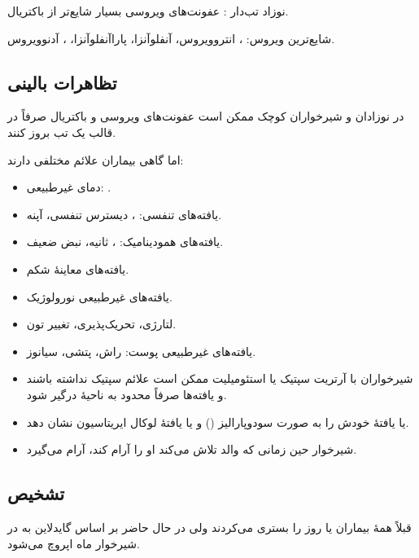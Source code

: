 \documentclass[12pt,a4paper]{article}
\begin{document}
نوزاد تب‌دار : عفونت‌های ویروسی بسیار شایع‌تر از باکتریال.

شایع‌ترین ویروس: ، انتروویروس، آنفلوآنزا، پاراآنفلوآنزا، ، آدنوویروس.

\subsection*{تظاهرات بالینی}
در نوزادان و شیرخواران کوچک ممکن است عفونت‌های ویروسی و باکتریال صرفاً در قالب یک تب بروز کنند.

اما گاهی بیماران علائم مختلفی دارند:
\begin{itemize}
\item دمای غیرطبیعی: .
\item یافته‌های تنفسی: ، دیسترس تنفسی، آپنه.
\item یافته‌های همودینامیک: ،  ثانیه، نبض ضعیف.
\item یافته‌های معاینهٔ شکم.
\item یافته‌های غیرطبیعی نورولوژیک.
\item لتارژی، تحریک‌پذیری، تغییر تون.
\item یافته‌های غیرطبیعی پوست: راش، پتشی، سیانوز.
\end{itemize}

\begin{itemize}
\item شیرخواران با آرتریت سپتیک یا استئومیلیت ممکن است علائم سپتیک نداشته باشند و یافته‌ها صرفاً محدود به ناحیهٔ درگیر شود.
\item یا یافتهٔ خودش را به صورت سودوپارالیز () و یا یافتهٔ لوکال ایریتاسیون نشان دهد.
\item شیرخوار حین زمانی که والد تلاش می‌کند او را آرام کند، آرام می‌گیرد.
\end{itemize}

\subsection*{تشخیص}
قبلاً همهٔ بیماران  یا  روز را بستری می‌کردند ولی در حال حاضر بر اساس گایدلاین  به  در شیرخوار  ماه اپروچ می‌شود.
\end{document}
